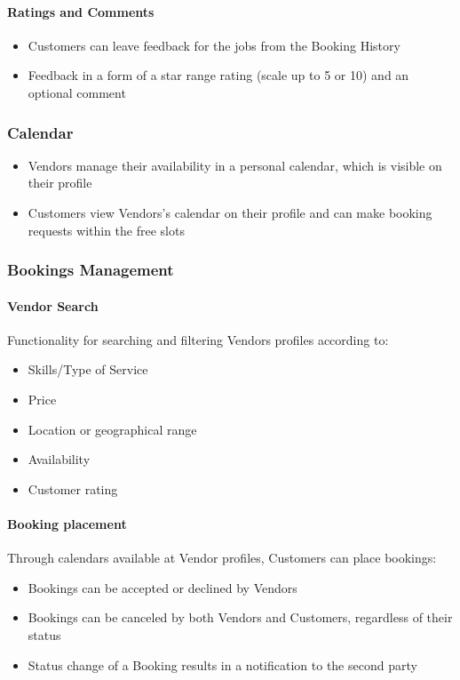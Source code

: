 \documentclass[11pt,a4paper]{article}
\begin{document}
\paragraph{Ratings and Comments}
\begin{itemize}
  \item Customers can leave feedback for the jobs from the Booking History
  \item Feedback in a form of a star range rating (scale up to 5 or
    10) and an optional comment
\end{itemize}

\subsubsection{Calendar}
\begin{itemize}
  \item Vendors manage their availability in a personal calendar,
    which is visible on their profile
  \item Customers view Vendors's calendar on their profile and can
    make booking requests within the free slots
\end{itemize}

\subsubsection{Bookings Management}

\paragraph{Vendor Search}

Functionality for searching and filtering Vendors profiles according to:
\begin{itemize}
  \item Skills/Type of Service
  \item Price
  \item Location or geographical range
  \item Availability
  \item Customer rating
\end{itemize}

\paragraph{Booking placement}

Through calendars available at Vendor profiles, Customers can place bookings:
\begin{itemize}
  \item Bookings can be accepted or declined by Vendors
  \item Bookings can be canceled by both Vendors and Customers,
    regardless of their status
  \item Status change of a Booking results in a notification to the second party
\end{itemize}
\end{document}
